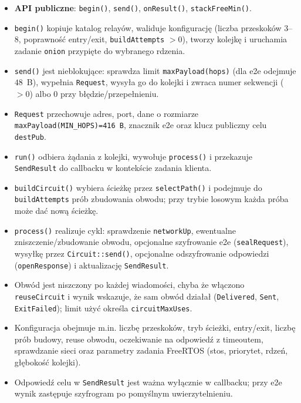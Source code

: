\documentclass[thesis=inz,faculty=ee]{EE-dyplom}
\begin{document}
    \begin{itemize}
        \item \textbf{API publiczne}: \texttt{begin()}, \texttt{send()}, \texttt{onResult()}, \texttt{stackFreeMin()}.
        \item \texttt{begin()} kopiuje katalog relayów, waliduje konfigurację (liczba przeskoków \(3\)--\(8\), poprawność entry/exit, \texttt{buildAttempts} \(>0\)), tworzy 
        kolejkę i uruchamia zadanie \texttt{onion} przypięte do wybranego rdzenia.
        \item \texttt{send()} jest nieblokujące: sprawdza limit \texttt{maxPayload(hops)} (dla e2e odejmuje \(48\)~B), wypełnia \texttt{Request}, wysyła go do kolejki i 
        zwraca numer sekwencji (\(>0\)) albo \(0\) przy błędzie/przepełnieniu.
        \item \texttt{Request} przechowuje adres, port, dane o rozmiarze \texttt{maxPayload(MIN\_HOPS)=416~B}, znacznik e2e oraz klucz publiczny celu \texttt{destPub}.
        \item \texttt{run()} odbiera żądania z kolejki, wywołuje \texttt{process()} i przekazuje \texttt{SendResult} do callbacku w kontekście zadania klienta.
        \item \texttt{buildCircuit()} wybiera ścieżkę przez \texttt{selectPath()} i podejmuje do \texttt{buildAttempts} prób zbudowania obwodu; przy trybie losowym każda 
        próba może dać nową ścieżkę.
        \item \texttt{process()} realizuje cykl: sprawdzenie \texttt{networkUp}, ewentualne zniszczenie/zbudowanie obwodu, opcjonalne szyfrowanie e2e (\texttt{sealRequest}), 
        wysyłkę przez \texttt{Circuit::send()}, opcjonalne odszyfrowanie odpowiedzi (\texttt{openResponse}) i aktualizację \texttt{SendResult}.
        \item Obwód jest niszczony po każdej wiadomości, chyba że włączono \texttt{reuseCircuit} i wynik wskazuje, że sam obwód działał (\texttt{Delivered}, \texttt{Sent}, 
        \texttt{ExitFailed}); limit użyć określa \texttt{circuitMaxUses}.
        \item Konfiguracja obejmuje m.in. liczbę przeskoków, tryb ścieżki, entry/exit, liczbę prób budowy, reuse obwodu, oczekiwanie na odpowiedź z timeoutem, sprawdzanie sieci 
        oraz parametry zadania FreeRTOS (stos, priorytet, rdzeń, głębokość kolejki).
        \item Odpowiedź celu w \texttt{SendResult} jest ważna wyłącznie w callbacku; przy e2e wynik zastępuje szyfrogram po pomyślnym uwierzytelnieniu.
    \end{itemize}
\end{document}
